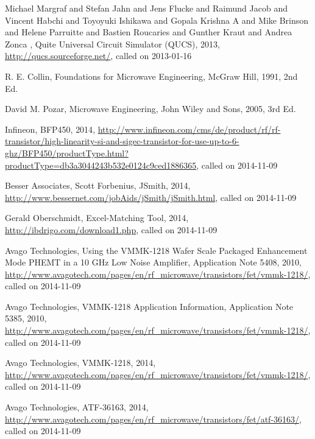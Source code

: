 \begin{thebibliography}{1}
	 {Michael Margraf and Stefan Jahn and Jens Flucke and Raimund Jacob and Vincent Habchi and Toyoyuki Ishikawa and Gopala Krishna A  and Mike Brinson  and Helene Parruitte and Bastien Roucaries and  Gunther Kraut and Andrea Zonca },	 {Quite Universal Circuit Simulator (QUCS)},
   {2013},
   \url{http://qucs.sourceforge.net/},
   {called on 2013-01-16}

 {R. E. Collin},
 {Foundations for Microwave Engineering},
 {McGraw Hill},
 1991,
 2nd Ed.


  {David M. Pozar},
   {Microwave Engineering},
  {John Wiley and Sons},
  2005,
  3rd Ed.

  {Infineon},
  {BFP450},
  {2014},
  \url{http://www.infineon.com/cms/de/product/rf/rf-transistor/high-linearity-si-and-sigec-transistor-for-use-up-to-6-ghz/BFP450/productType.html?productType=db3a3044243b532e0124c9ced1886365},
  {called on 2014-11-09}


  {Besser Associates}, 
  {Scott Forbenius},
  {JSmith},
  {2014},
  \url{http://www.bessernet.com/jobAids/jSmith/jSmith.html},
  {called on 2014-11-09}


  {Gerald Oberschmidt},
  {Excel-Matching Tool},
  {2014},
  \url{http://ibdrigo.com/download1.php},
  {called on 2014-11-09}


  {Avago Technologies},
  {Using the VMMK-1218 Wafer Scale Packaged Enhancement Mode PHEMT 
in a 10 GHz Low Noise Amplifier, Application Note 5408},
  {2010},
  \url{http://www.avagotech.com/pages/en/rf_microwave/transistors/fet/vmmk-1218/},
  {called on 2014-11-09}


  {Avago Technologies},
  {VMMK-1218 Application Information, Application Note 5385},
  {2010},
  \url{http://www.avagotech.com/pages/en/rf_microwave/transistors/fet/vmmk-1218/},
  {called on 2014-11-09}


  {Avago Technologies},
  {VMMK-1218},
  {2014},
  \url{http://www.avagotech.com/pages/en/rf_microwave/transistors/fet/vmmk-1218/},
  {called on 2014-11-09}


  {Avago Technologies},
  {ATF-36163},
  {2014},
  \url{http://www.avagotech.com/pages/en/rf_microwave/transistors/fet/atf-36163/},
  {called on 2014-11-09}


\end{thebibliography}
